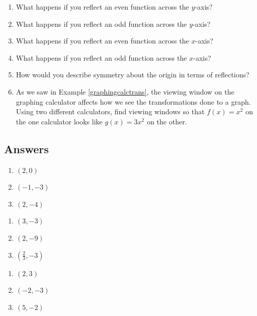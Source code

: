 \begin{enumerate}
\item What happens if you reflect an even function across the $y$-axis?  
\item What happens if you reflect an odd function across the $y$-axis?   
\item What happens if you reflect an even function across the $x$-axis?  
\item What happens if you reflect an odd function across the $x$-axis?  
\item How would you describe symmetry about the origin in terms of reflections?

\item As we saw in Example \ref{graphingcalctrans}, the viewing window on the graphing calculator affects how we see the transformations done to a graph.  Using two different calculators, find viewing windows so that $f(x) = x^{2}$ on the one calculator looks like $g(x) = 3x^{2}$ on the other.

\end{enumerate}

\newpage

\subsection{Answers}

\begin{multicols}{3}
\begin{enumerate}

\item $(2,0)$
\item $(-1,-3)$
\item $(2,-4)$

\setcounter{HW}{\value{enumi}}
\end{enumerate}
\end{multicols}

\begin{multicols}{3}
\begin{enumerate}
\setcounter{enumi}{\value{HW}}

\item $(3,-3)$
\item $(2,-9)$
\item $\left(\frac{2}{3}, -3\right)$

\setcounter{HW}{\value{enumi}}
\end{enumerate}
\end{multicols}

\begin{multicols}{3}
\begin{enumerate}
\setcounter{enumi}{\value{HW}}

\item $(2,3)$
\item $(-2,-3)$
\item $(5,-2)$

\setcounter{HW}{\value{enumi}}
\end{enumerate}
\end{multicols}

